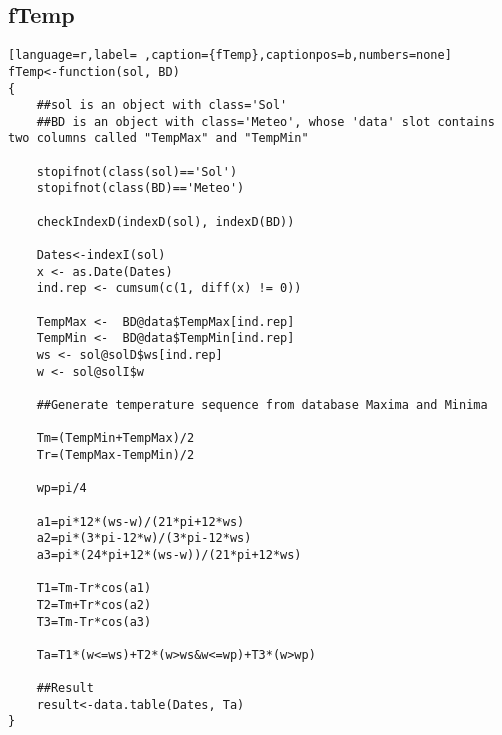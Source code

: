 \subsection{fTemp}
\label{sec:orgdf8c320}
\label{subsec:ftemp}
\begin{lstlisting}[language=r,label= ,caption={fTemp},captionpos=b,numbers=none]
fTemp<-function(sol, BD)
{
    ##sol is an object with class='Sol'
    ##BD is an object with class='Meteo', whose 'data' slot contains two columns called "TempMax" and "TempMin"

    stopifnot(class(sol)=='Sol')
    stopifnot(class(BD)=='Meteo')

    checkIndexD(indexD(sol), indexD(BD))

    Dates<-indexI(sol)	
    x <- as.Date(Dates)
    ind.rep <- cumsum(c(1, diff(x) != 0))

    TempMax <-  BD@data$TempMax[ind.rep]
    TempMin <-  BD@data$TempMin[ind.rep]
    ws <- sol@solD$ws[ind.rep]
    w <- sol@solI$w

    ##Generate temperature sequence from database Maxima and Minima

    Tm=(TempMin+TempMax)/2
    Tr=(TempMax-TempMin)/2

    wp=pi/4

    a1=pi*12*(ws-w)/(21*pi+12*ws)
    a2=pi*(3*pi-12*w)/(3*pi-12*ws)
    a3=pi*(24*pi+12*(ws-w))/(21*pi+12*ws)

    T1=Tm-Tr*cos(a1)
    T2=Tm+Tr*cos(a2)
    T3=Tm-Tr*cos(a3)

    Ta=T1*(w<=ws)+T2*(w>ws&w<=wp)+T3*(w>wp)

    ##Result
    result<-data.table(Dates, Ta)
}
\end{lstlisting}
